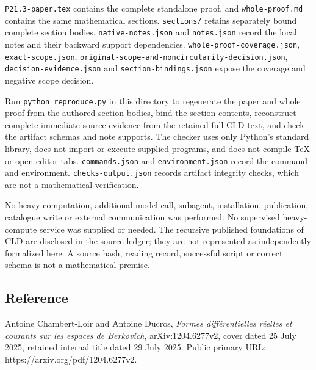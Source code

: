 \documentclass[11pt]{article}
\begin{document}
\texttt{P21.3-paper.tex} contains the complete standalone proof, and \texttt{whole-proof.md} contains the same mathematical sections. \texttt{sections/} retains separately bound complete section bodies. \texttt{native-notes.json} and \texttt{notes.json} record the local notes and their backward support dependencies. \texttt{whole-proof-coverage.json}, \texttt{exact-scope.json}, \texttt{original-scope-and-noncircularity-decision.json}, \texttt{decision-evidence.json} and \texttt{section-bindings.json} expose the coverage and negative scope decision.

Run \texttt{python reproduce.py} in this directory to regenerate the paper and whole proof from the authored section bodies, bind the section contents, reconstruct complete immediate source evidence from the retained full CLD text, and check the artifact schemas and note supports. The checker uses only Python's standard library, does not import or execute supplied programs, and does not compile TeX or open editor tabs. \texttt{commands.json} and \texttt{environment.json} record the command and environment. \texttt{checks-output.json} records artifact integrity checks, which are not a mathematical verification.

No heavy computation, additional model call, subagent, installation, publication, catalogue write or external communication was performed. No supervised heavy-compute service was supplied or needed. The recursive published foundations of CLD are disclosed in the source ledger; they are not represented as independently formalized here. A source hash, reading record, successful script or correct schema is not a mathematical premise.

\subsection{Reference}

Antoine Chambert-Loir and Antoine Ducros, \emph{Formes différentielles réelles et courants sur les espaces de Berkovich}, arXiv:1204.6277v2, cover dated 25 July 2025, retained internal title dated 29 July 2025. Public primary URL: https://arxiv.org/pdf/1204.6277v2.
\end{document}
